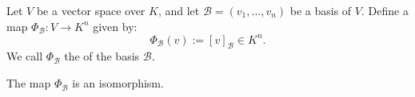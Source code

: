 \begin{definition*}
\label{def:coordinate_map}
Let $V$ be a vector space over $K$, and let $\mathcal{B} = (v_1, \dots, v_n)$ be a basis of $V$.
Define a map $\Phi_{\mathcal{B}}: V \to K^n$ given by:
\[
\Phi_{\mathcal{B}}(v) := [v]_{\mathcal{B}} \in K^n.
\]
We call $\Phi_{\mathcal{B}}$ the  of the basis $\mathcal{B}$.
\end{definition*}

\begin{proposition}
\label{prop:coordinate_map_isomorphism}
The map $\Phi_{\mathcal{B}}$ is an isomorphism.
\end{proposition}

